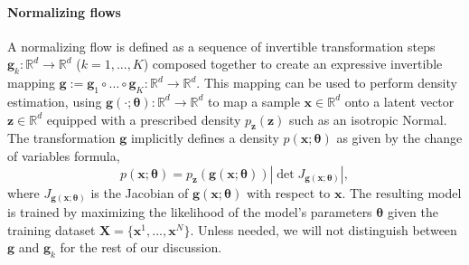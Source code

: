 \paragraph{Normalizing flows}
A normalizing flow is defined as a sequence of invertible transformation steps $\mathbf{g}_k : \mathbb{R}^d \to \mathbb{R}^d$  ($k=1, ..., K$)  composed together to create an expressive invertible mapping $\mathbf{g} := \mathbf{g}_1 \circ \dots \circ \mathbf{g}_K : \mathbb{R}^d \to \mathbb{R}^d$. %
This mapping can be used to perform density estimation, using $\mathbf{g}(\cdot ;\mathbf{\theta}): \mathbb{R}^d \rightarrow \mathbb{R}^d$ to map a sample $\mathbf{x} \in \mathbb{R}^d$ onto a latent vector $\mathbf{z} \in \mathbb{R}^d$ equipped with a prescribed density $p_{\mathbf{z}}(\mathbf{z})$ such as an isotropic Normal.
The transformation $\mathbf{g}$ implicitly defines a density $p(\mathbf{x}; \mathbf{\theta})$ as given by the change of variables formula,
\begin{equation}
    p(\mathbf{x}; \mathbf{\theta}) = p_{\mathbf{z}}(\mathbf{g}(\mathbf{x};\mathbf{\theta})) \left| \det  J_{\mathbf{g}(\mathbf{x};\mathbf{\theta})} \right|, \label{eq:NF_DE}
\end{equation}
where $J_{\mathbf{g}(\mathbf{x};\mathbf{\theta})}$ is the Jacobian of $\mathbf{g}(\mathbf{x};\mathbf{\theta})$ with respect to $\mathbf x$. The resulting model is trained by maximizing the likelihood of the model's parameters $\mathbf{\theta}$ given the training dataset $\mathbf{X} = \{\mathbf{x}^1, ..., \mathbf{x}^N\}$.
Unless needed, we will not distinguish between $\mathbf{g}$ and $\mathbf{g}_k$ for the rest of our discussion.

